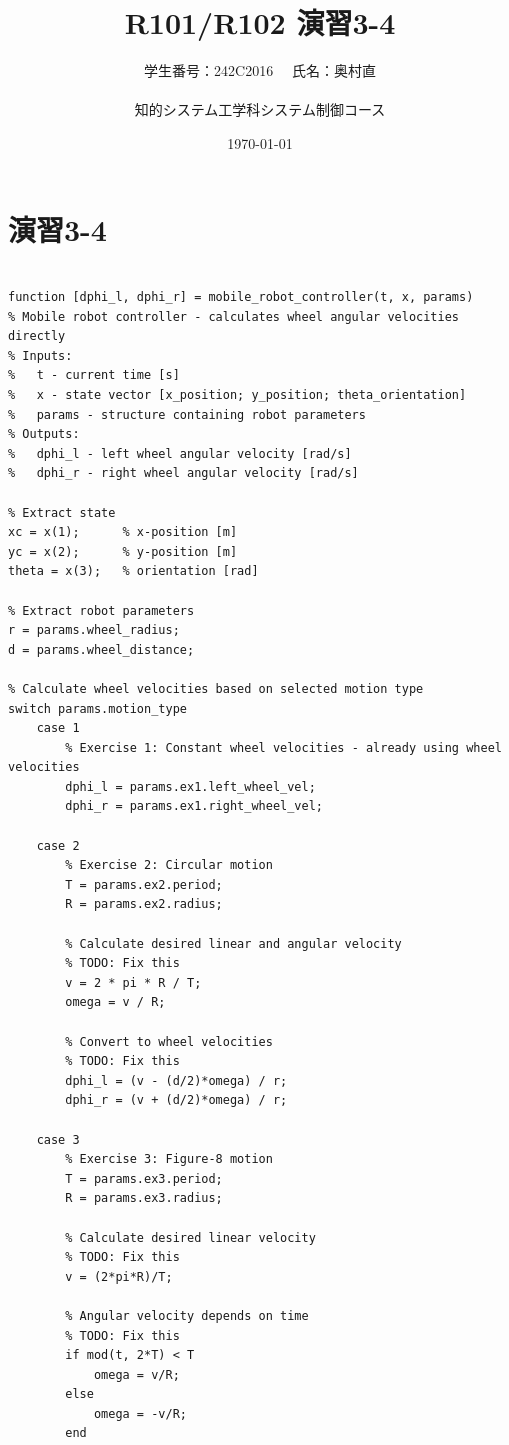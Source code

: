 \documentclass[10pt,a4paper,titlepage]{jreport} %
\title{R101/R102 演習3-4} %
\author{
  学生番号：242C2016 　氏名：奥村直 \\
  \\
  知的システム工学科システム制御コース
  } %
\date{\today} %
\begin{document}
\maketitle

\chapter{演習3-4}

\begin{lstlisting}[caption=modified＿mobile＿robot＿controller.m]

function [dphi_l, dphi_r] = mobile_robot_controller(t, x, params)
% Mobile robot controller - calculates wheel angular velocities directly
% Inputs:
%   t - current time [s]
%   x - state vector [x_position; y_position; theta_orientation]
%   params - structure containing robot parameters
% Outputs:
%   dphi_l - left wheel angular velocity [rad/s]
%   dphi_r - right wheel angular velocity [rad/s]

% Extract state
xc = x(1);      % x-position [m]
yc = x(2);      % y-position [m]
theta = x(3);   % orientation [rad]

% Extract robot parameters
r = params.wheel_radius;
d = params.wheel_distance;

% Calculate wheel velocities based on selected motion type
switch params.motion_type
    case 1
        % Exercise 1: Constant wheel velocities - already using wheel velocities
        dphi_l = params.ex1.left_wheel_vel;
        dphi_r = params.ex1.right_wheel_vel;
        
    case 2
        % Exercise 2: Circular motion
        T = params.ex2.period;
        R = params.ex2.radius;
        
        % Calculate desired linear and angular velocity
        % TODO: Fix this
        v = 2 * pi * R / T;
        omega = v / R;
        
        % Convert to wheel velocities
        % TODO: Fix this
        dphi_l = (v - (d/2)*omega) / r;
        dphi_r = (v + (d/2)*omega) / r;
        
    case 3
        % Exercise 3: Figure-8 motion
        T = params.ex3.period;
        R = params.ex3.radius;
        
        % Calculate desired linear velocity
        % TODO: Fix this
        v = (2*pi*R)/T;
        
        % Angular velocity depends on time
        % TODO: Fix this
        if mod(t, 2*T) < T
            omega = v/R;
        else
            omega = -v/R;
        end
        

\end{lstlisting}
\end{document}
